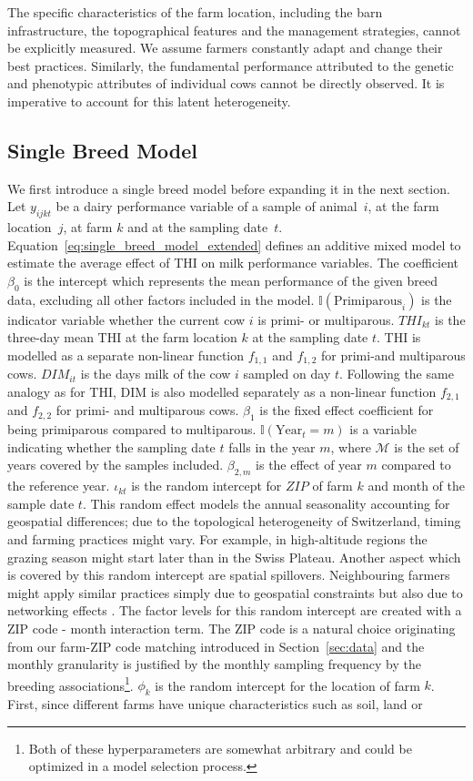 The specific characteristics of the farm location, including the barn infrastructure, the topographical features and the management strategies, cannot be explicitly measured. We assume farmers constantly adapt and change their best practices. Similarly, the fundamental performance attributed to the genetic and phenotypic attributes of individual cows cannot be directly observed. It is imperative to account for this latent heterogeneity.

\subsection{Single Breed Model}\label{sec:single_breed_model}
We first introduce a single breed model before expanding it in the next section.
Let $y_{ijkt}$ be a dairy performance variable of a sample of animal~$i$, at the farm location~$j$, at farm $k$ and at the sampling date~$t$. Equation~\ref{eq:single_breed_model_extended} defines an additive mixed model to estimate the average effect of THI on milk performance variables. The coefficient $\beta_0$ is the intercept which represents the mean performance of the given breed data, excluding all other factors included in the model. $\mathbb{I}(\text{Primiparous}_i)$ is the indicator variable whether the current cow $i$ is primi- or multiparous. $\textit{THI}_{kt}$ is the three-day mean THI at the farm location $k$ at the sampling date $t$. THI is modelled as a separate non-linear function $f_{1,1}$ and $f_{1,2}$ for primi-and multiparous cows. $\textit{DIM}_{it}$ is the days milk of the cow $i$ sampled on day $t$. Following the same analogy as for THI, DIM is also modelled separately as a non-linear function $f_{2,1}$ and $f_{2,2}$ for primi- and multiparous cows. $\beta_1$ is the fixed effect coefficient for being primiparous compared to multiparous. $\mathbb{I}(\text{Year}_t = m)$ is a variable indicating whether the sampling date $t$ falls in the year $m$, where $\mathcal{M}$ is the set of years covered by the samples included. $\beta_{2,m}$ is the effect of year $m$ compared to the reference year. $\iota_{kt}$ is the random intercept for $ZIP$ of farm $k$ and month of the sample date $t$. This random effect models the annual seasonality accounting for geospatial differences; due to the topological heterogeneity of Switzerland, timing and farming practices might vary. For example, in high-altitude regions the grazing season might start later than in the Swiss Plateau. Another aspect which is covered by this random intercept are spatial spillovers. Neighbouring farmers might apply similar practices simply due to geospatial constraints but also due to networking effects \citep{young1959neighborhood}. The factor levels for this random intercept are created with a ZIP code - month interaction term. The ZIP code is a natural choice originating from our farm-ZIP code matching introduced in Section~\ref{sec:data} and the monthly granularity is justified by the monthly sampling frequency by the breeding associations\footnote{Both of these hyperparameters are somewhat arbitrary and could be optimized in a model selection process.}. $\phi_{k}$ is the random intercept for the location of farm $k$. First, since different farms have unique characteristics such as soil, land or 